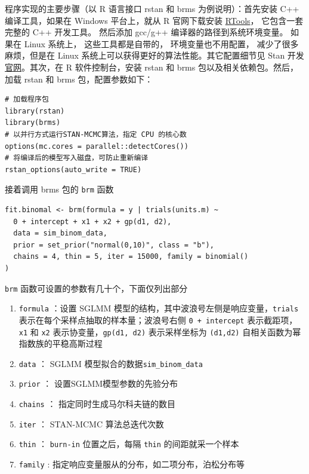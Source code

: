 \documentclass[12pt,a4paper,UTF8,twoside]{book}
\providecommand{\tightlist}{%
  \setlength{\itemsep}{0pt}\setlength{\parskip}{0pt}}
\theoremstyle{definition}
\theoremstyle{definition}
\theoremstyle{definition}
\theoremstyle{remark}
\begin{document}
程序实现的主要步骤（以 R 语言接口 rstan 和 brms 为例说明）：首先安装 C++
编译工具，如果在 Windows 平台上，就从 R 官网下载安装
\href{https://cran.r-project.org/bin/windows/Rtools/}{RTools}，
它包含一套完整的 C++ 开发工具。 然后添加 gcc/g++
编译器的路径到系统环境变量。 如果在 Linux 系统上， 这些工具都是自带的，
环境变量也不用配置， 减少了很多麻烦，但是在 Linux
系统上可以获得更好的算法性能。其它配置细节见 Stan
开发\href{https://github.com/stan-dev/rstan/wiki}{官网}。其次，在 R
软件控制台，安装 rstan 和 brms 包以及相关依赖包。然后，加载 rstan 和
brms 包，配置参数如下：

\begin{verbatim}
# 加载程序包
library(rstan)
library(brms)
# 以并行方式运行STAN-MCMC算法，指定 CPU 的核心数
options(mc.cores = parallel::detectCores())
# 将编译后的模型写入磁盘，可防止重新编译
rstan_options(auto_write = TRUE)
\end{verbatim}

\noindent 接着调用 brms 包的 \texttt{brm} 函数

\begin{verbatim}
fit.binomal <- brm(formula = y | trials(units.m) ~ 
  0 + intercept + x1 + x2 + gp(d1, d2), 
  data = sim_binom_data,
  prior = set_prior("normal(0,10)", class = "b"),
  chains = 4, thin = 5, iter = 15000, family = binomial()
)    
\end{verbatim}

\texttt{brm} 函数可设置的参数有几十个，下面仅列出部分

\begin{enumerate}
\def\labelenumi{\arabic{enumi}.}
\tightlist
\item
  \texttt{formula} ：设置 SGLMM
  模型的结构，其中波浪号左侧是响应变量，\texttt{trials}
  表示在每个采样点抽取的样本量；波浪号右侧 \texttt{0\ +\ intercept}
  表示截距项， \texttt{x1} 和 \texttt{x2}
  表示协变量，\texttt{gp(d1,\ d2)} 表示采样坐标为 \texttt{(d1,d2)}
  自相关函数为幂指数族的平稳高斯过程
\item
  \texttt{data} ： SGLMM 模型拟合的数据\texttt{sim\_binom\_data}
\item
  \texttt{prior} ： 设置SGLMM模型参数的先验分布
\item
  \texttt{chains} ： 指定同时生成马尔科夫链的数目
\item
  \texttt{iter} ： STAN-MCMC 算法总迭代次数
\item
  \texttt{thin} ： \texttt{burn-in} 位置之后，每隔 \texttt{thin}
  的间距就采一个样本
\item
  \texttt{family} : 指定响应变量服从的分布，如二项分布，泊松分布等
\end{enumerate}
\end{document}
